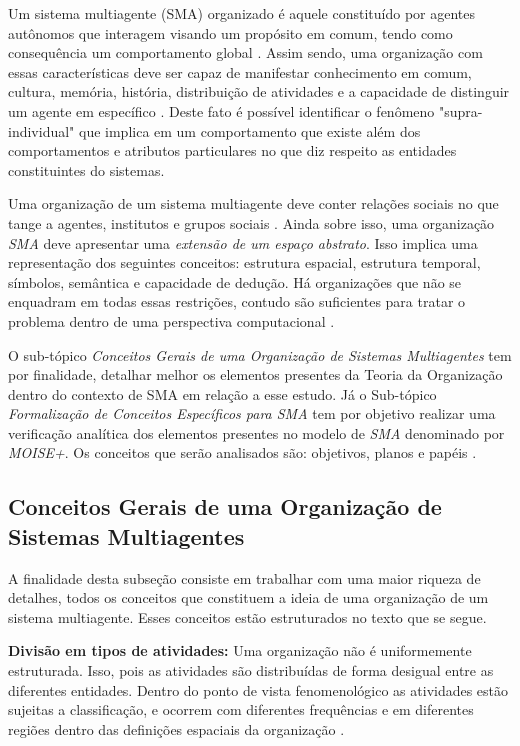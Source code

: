 Um sistema multiagente (SMA) organizado é aquele constituído por agentes autônomos que interagem visando um propósito em comum, tendo como consequência um comportamento global \cite{moiseframework} \cite{organiationofmultiagentsystem}. Assim sendo, uma organização com essas características deve ser capaz de manifestar conhecimento em comum, cultura, memória, história, distribuição de atividades e a capacidade de distinguir um  agente em específico \cite{organiationofmultiagentsystem}. Deste fato é possível identificar o fenômeno "supra-individual" que implica em um comportamento que existe além dos comportamentos e atributos particulares no que diz respeito as entidades constituintes do sistemas. 

Uma organização de um sistema multiagente deve conter relações sociais no que tange a agentes, institutos e grupos sociais \cite{organiationofmultiagentsystem}. Ainda sobre isso, uma organização \textit{SMA} deve apresentar uma \textit{extensão de um espaço abstrato}. Isso implica uma representação dos seguintes conceitos: estrutura espacial, estrutura temporal, símbolos, semântica e capacidade de dedução. Há organizações que não se enquadram em todas essas restrições, contudo são suficientes para tratar o problema dentro de uma perspectiva computacional \cite{organiationofmultiagentsystem}.

O sub-tópico \textit{Conceitos Gerais de uma Organização de Sistemas Multiagentes} tem por finalidade, detalhar melhor os elementos presentes da Teoria da Organização dentro do contexto de SMA em relação a esse estudo. Já o Sub-tópico \textit{Formalização de Conceitos Específicos para SMA} tem por objetivo realizar uma verificação analítica dos elementos presentes no modelo de \textit{SMA} denominado por \textit{MOISE+}. Os conceitos que serão analisados são: objetivos, planos e papéis \cite{organiationofmultiagentsystem}.
   

\subsection{Conceitos Gerais de uma Organização de Sistemas Multiagentes}

A finalidade desta subseção consiste em trabalhar com uma maior riqueza de detalhes, todos os conceitos que constituem a ideia de uma organização de um sistema multiagente. Esses conceitos estão estruturados no texto que se segue.
  
\textbf{Divisão em tipos de atividades:} Uma organização não é uniformemente estruturada. Isso, pois as atividades são distribuídas de forma desigual entre as diferentes entidades. Dentro do ponto de vista fenomenológico as atividades estão sujeitas a classificação, e ocorrem com diferentes frequências e em diferentes regiões dentro das definições espaciais da organização \cite{organiationofmultiagentsystem}.

